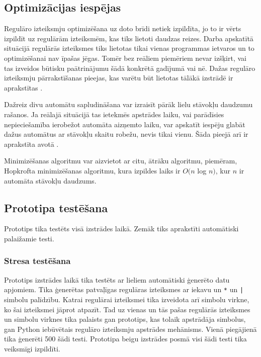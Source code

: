 \subsection{\label{subsec:solution_optimization}Optimizācijas iespējas}

Regulāro izteiksmju optimizēšana uz doto brīdi netiek izpildīta, jo to ir vērts izpildīt uz regulārām izteiksmēm, kas tiks lietoti daudzas reizes. Darba apskatītā situācijā regulārās izteiksmes tiks lietotas tikai vienas programmas ietvaros un to optimizēšanai nav īpašas jēgas. Tomēr bez reāliem piemēriem nevar izšķirt, vai tas izveidos būtisku paātrinājumu šādā konkrētā gadījumā vai nē. Dažas regulāro izteiksmju pārrakstīšanas pieejas, kas varētu būt lietotas tālākā izstrādē ir aprakstītas \cite{Yu:FMR}.

Dažreiz divu automātu sapludināšana var izraisīt pārāk lielu stāvokļu daudzumu rašanos. Ja reālajā situācijā tas ietekmēs apstrādes laiku, vai parādīsies nepieciešamība ierobežot automāta aizņemto laiku, var apskatīt iespēju glabāt dažus automātus ar stāvokļu skaitu robežu, nevis tikai vienu. Šāda pieejā arī ir aprakstīta avotā \cite{Yu:FMR}.

Minimizēšanas algoritmu var aizvietot ar citu, ātrāku algoritmu, piemēram, Hopkrofta minimizēšanas algoritmu, kura izpildes laiks ir $O(n$ log $n)$, kur $n$ ir automāta stāvokļu daudzums. \cite{Berstel:MA}

\subsection{\label{sbs:res_testing}Prototipa testēšana}

Prototips tika testēts visā izstrādes laikā. Zemāk tiks aprakstīti automātiski palaižamie testi. 

\subsubsection{Stresa testēšana}

Prototips izstrādes laikā tika testēts ar lieliem automātiski ģenerēto datu apjomiem. Tika ģenerētas patvaļīgas regulāras izteiksmes ar iekavu un \verb|*| un \verb/|/ simbolu palīdzību. Katrai regulārai izteiksmei tika izveidota arī simbolu virkne, ko šai izteiksmei jāprot atpazīt. Tad uz vienas un tās pašas regulārās izteiksmes un simbolu virknes tika palaists gan prototips, kas tolaik apstrādāja simbolus, gan Python iebūvētais regulāro izteiksmju apstrādes mehānisms. Vienā piegājienā tika ģenerēti 500 šādi testi. Prototipa beigu izstrādes posmā visi šādi testi tika veiksmīgi izpildīti.

